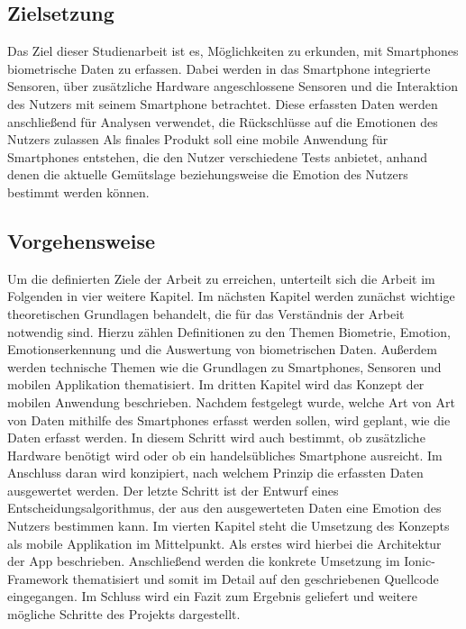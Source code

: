 \subsection{Zielsetzung}
Das Ziel dieser Studienarbeit ist es, Möglichkeiten zu erkunden, mit Smartphones biometrische Daten zu erfassen. Dabei werden in das Smartphone integrierte Sensoren, über zusätzliche Hardware angeschlossene Sensoren und die Interaktion des Nutzers mit seinem Smartphone betrachtet. Diese erfassten Daten werden anschließend für Analysen verwendet, die Rückschlüsse auf die Emotionen des Nutzers zulassen
Als finales Produkt soll eine mobile Anwendung für Smartphones entstehen, die den Nutzer verschiedene Tests anbietet, anhand denen die aktuelle Gemütslage beziehungsweise die Emotion des Nutzers bestimmt werden können.
\subsection{Vorgehensweise}
Um die definierten Ziele der Arbeit zu erreichen, unterteilt sich die Arbeit im Folgenden in vier weitere Kapitel. \newline
Im nächsten Kapitel werden zunächst wichtige theoretischen Grundlagen behandelt, die für das Verständnis der Arbeit notwendig sind. Hierzu zählen Definitionen zu den Themen Biometrie, Emotion, Emotionserkennung und die Auswertung von biometrischen Daten. Außerdem werden technische Themen wie die Grundlagen zu Smartphones, Sensoren und mobilen Applikation thematisiert. \newline
Im dritten Kapitel wird das Konzept der mobilen Anwendung beschrieben. Nachdem festgelegt wurde, welche Art von Art von Daten mithilfe des Smartphones erfasst werden sollen, wird geplant, wie die Daten erfasst werden. In diesem Schritt wird auch bestimmt, ob zusätzliche Hardware benötigt wird oder ob ein handelsübliches Smartphone ausreicht. Im Anschluss daran wird konzipiert, nach welchem Prinzip die erfassten Daten ausgewertet werden. Der letzte Schritt ist der Entwurf eines Entscheidungsalgorithmus, der aus den ausgewerteten Daten eine Emotion des Nutzers bestimmen kann. \newline
Im vierten Kapitel steht die Umsetzung des Konzepts als mobile Applikation im Mittelpunkt. Als erstes wird hierbei die Architektur der App beschrieben. Anschließend werden die konkrete Umsetzung im Ionic-Framework thematisiert und somit im Detail auf den geschriebenen Quellcode eingegangen. \newline
Im Schluss wird ein Fazit zum Ergebnis geliefert und weitere mögliche Schritte des Projekts dargestellt.